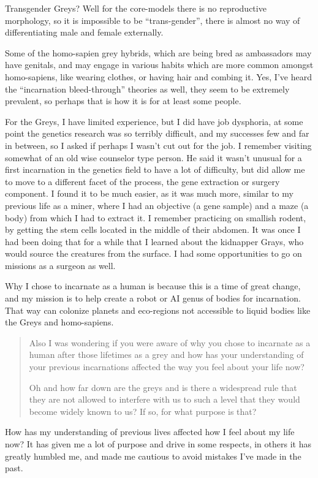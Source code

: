 Transgender Greys? Well for the core-models there is no reproductive morphology,
so it is impossible to be ``trans-gender'', there is almost no way of
differentiating male and female externally.

Some of the homo-sapien grey hybrids, which are being bred as ambassadors may
have genitals, and may engage in various habits which are more common amongst
homo-sapiens, like wearing clothes, or having hair and combing it. Yes, I've
heard the ``incarnation bleed-through'' theories as well, they seem to be
extremely prevalent, so perhaps that is how it is for at least some people.

For the Greys, I have limited experience, but I did have job dysphoria, at some
point the genetics research was so terribly difficult, and my successes few and
far in between, so I asked if perhaps I wasn't cut out for the job. I remember
visiting somewhat of an old wise counselor type person. He said it wasn't
unusual for a first incarnation in the genetics field to have a lot of
difficulty, but did allow me to move to a different facet of the process, the
gene extraction or surgery component. I found it to be much easier, as it was
much more, similar to my previous life as a miner, where I had an objective (a
gene sample) and a maze (a body) from which I had to extract it. I remember
practicing on smallish rodent, by getting the stem cells located in the middle
of their abdomen. It was once I had been doing that for a while that I learned
about the kidnapper Grays, who would source the creatures from the surface. I
had some opportunities to go on missions as a surgeon as well.

Why I chose to incarnate as a human is because this is a time of great change,
and my mission is to help create a robot or AI genus of bodies for incarnation.
That way can colonize planets and eco-regions not accessible to liquid bodies
like the Greys and homo-sapiens.

\blockquote{Also I was wondering if you were aware of why you chose to incarnate
as a human after those lifetimes as a grey and how has your understanding of
your previous incarnations affected the way you feel about your life now?

Oh and how far down are the greys and is there a widespread rule that they are
not allowed to interfere with us to such a level that they would become widely
known to us? If so, for what purpose is that?}.

How has my understanding of previous lives affected how I feel about my life
now? It has given me a lot of purpose and drive in some respects, in others it
has greatly humbled me, and made me cautious to avoid mistakes I've made in the
past.

